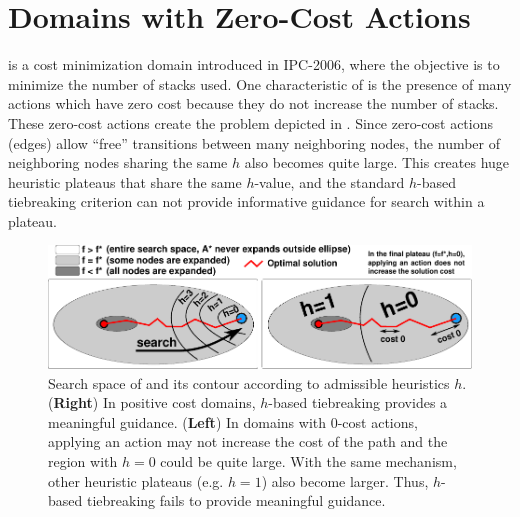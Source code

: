 \section{Domains with Zero-Cost Actions}
\label{sec:zerocost-domains}
  is a cost
minimization domain introduced in IPC-2006, where the objective is to 
minimize the number of stacks used.
One characteristic of  is the presence of many  actions which have zero cost because they do not increase the number of stacks. These zero-cost actions create the problem depicted in .
Since zero-cost actions (edges) allow ``free'' transitions between many neighboring nodes,
the number of neighboring nodes sharing the same $h$ also becomes quite large.
This creates huge heuristic plateaus that share the same $h$-value, and the standard $h$-based tiebreaking criterion can not provide informative guidance for search within a plateau.

\begin{figure}[htbp]
  \centering
  \includegraphics{img/astar/plateau-1.pdf}
 \caption{Search space of \astar and its contour according to admissible heuristics $h$. (\textbf{Right}) In positive cost domains, $h$-based tiebreaking provides a meaningful guidance. (\textbf{Left}) In domains with 0-cost actions, applying an action may not increase the cost of the path and the region with $h=0$ could be quite large. With the same mechanism, other heuristic plateaus (e.g. $h=1$) also become larger. Thus, $h$-based tiebreaking fails to provide meaningful guidance.
  }
 \label{fig:plateau-1}
\end{figure}




